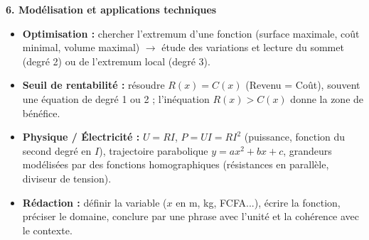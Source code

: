 \documentclass[11pt]{article}
\begin{document}
\textbf{6. Modélisation et applications techniques}\par
\begin{itemize}
  \item \textbf{Optimisation :} chercher l'extremum d'une fonction (surface maximale, coût minimal, volume maximal) $\rightarrow$ étude des variations et lecture du sommet (degré 2) ou de l'extremum local (degré 3).
  \item \textbf{Seuil de rentabilité :} résoudre $R(x)=C(x)$ (Revenu = Coût), souvent une équation de degré 1 ou 2 ; l'inéquation $R(x)>C(x)$ donne la zone de bénéfice.
  \item \textbf{Physique / Électricité :} $U=RI$, $P=UI=RI^2$ (puissance, fonction du second degré en $I$), trajectoire parabolique $y=ax^2+bx+c$, grandeurs modélisées par des fonctions homographiques (résistances en parallèle, diviseur de tension).
  \item \textbf{Rédaction :} définir la variable ($x$ en m, kg, FCFA...), écrire la fonction, préciser le domaine, conclure par une phrase avec l'unité et la cohérence avec le contexte.
\end{itemize}
\end{document}
